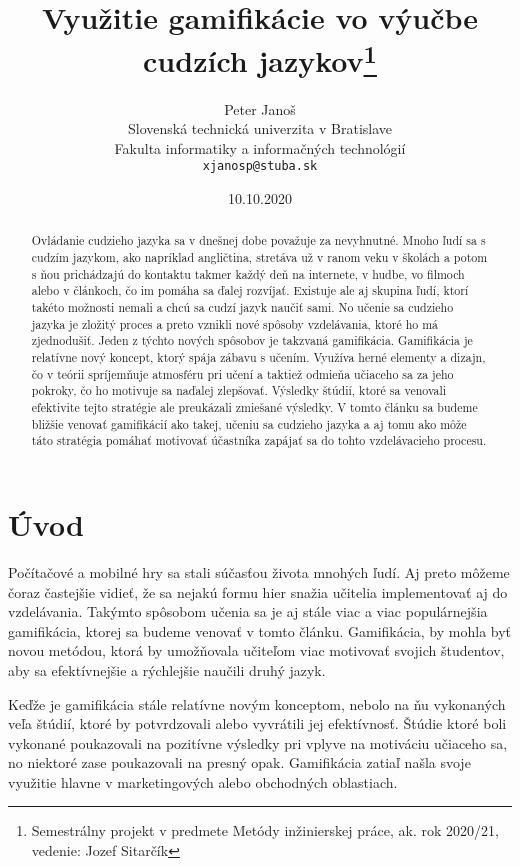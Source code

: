 \documentclass[10pt,oneside,slovak,a4paper]{article}
\title{Využitie gamifikácie vo výučbe cudzích jazykov\thanks{Semestrálny projekt v predmete Metódy inžinierskej práce, ak. rok 2020/21, vedenie: Jozef Sitarčík}} %
\author{Peter Janoš\\[2pt]
	{\small Slovenská technická univerzita v Bratislave}\\
	{\small Fakulta informatiky a informačných technológií}\\
	{\small \texttt{xjanosp@stuba.sk}}
	}
\date{\small 10.10.2020} %
\begin{document}
\maketitle

\begin{abstract}
Ovládanie cudzieho jazyka sa v dnešnej dobe považuje za nevyhnutné. Mnoho ľudí sa s cudzím jazykom, ako napríklad angličtina, stretáva už v ranom veku v školách a potom s ňou prichádzajú do kontaktu takmer každý deň na internete, v hudbe, vo filmoch alebo v článkoch, čo im pomáha sa ďalej rozvíjať. Existuje ale aj skupina ľudí, ktorí takéto možnosti nemali a chcú sa cudzí jazyk naučiť sami. No učenie sa cudzieho jazyka je zložitý proces a preto vznikli nové spôsoby vzdelávania, ktoré ho má zjednodušiť. Jeden z týchto nových spôsobov je takzvaná gamifikácia. Gamifikácia je relatívne nový koncept, ktorý spája zábavu s učením. Využíva herné elementy a dizajn, čo v teórii spríjemňuje atmosféru pri učení a taktiež odmieňa učiaceho sa za jeho pokroky, čo ho motivuje sa naďalej zlepšovať. Výsledky štúdií, ktoré sa venovali efektivite tejto stratégie ale preukázali zmiešané výsledky. V tomto článku sa budeme bližšie venovať gamifikácií ako takej, učeniu sa cudzieho jazyka a aj tomu ako môže táto stratégia pomáhať motivovať účastníka zapájať sa do tohto vzdelávacieho procesu.
\end{abstract}



\section{Úvod} \label{uvod}

Počítačové a mobilné hry sa stali súčasťou života mnohých ľudí. Aj preto môžeme čoraz častejšie vidieť, že sa nejakú formu hier snažia učitelia implementovať aj do vzdelávania. Takýmto spôsobom učenia sa je aj stále viac a viac populárnejšia gamifikácia, ktorej sa budeme venovať v tomto článku. Gamifikácia, by mohla byť novou metódou, ktorá by umožňovala učiteľom viac motivovať svojich študentov, aby sa efektívnejšie a rýchlejšie naučili druhý jazyk. 

Keďže je gamifikácia stále relatívne novým konceptom, nebolo na ňu vykonaných veľa štúdií, ktoré by potvrdzovali alebo vyvrátili jej efektívnosť. Štúdie ktoré boli vykonané poukazovali na pozitívne výsledky pri vplyve na motiváciu učiaceho sa, no niektoré zase poukazovali na presný opak. Gamifikácia zatiaľ našla svoje využitie hlavne v marketingových alebo obchodných oblastiach.
~\cite{garland2015gamification}
\end{document}
